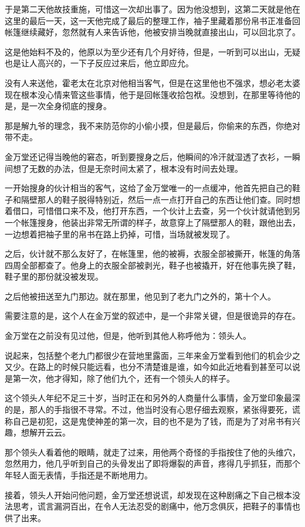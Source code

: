 于是第二天他故技重施，可惜这一次却出事了。因为他没想到，这第二天就是他在这里的最后一天，这一天他完成了最后的整理工作，袖子里藏着那份帛书正准备回帐篷继续藏好，忽然就有人来告诉他，他被安排当晚就直接出山，可以回北京了。

这是他始料不及的，他原以为至少还有几个月好待，但是，一听到可以出山，无疑也是让人高兴的，一下子反应过来后，他立即应允。

没有人来送他，霍老太在北京对他相当客气，但是在这里他也不强求，想必老太婆现在根本没心情来管这些事情，他于是回帐篷收拾包袱。没想到，在那里等待他的是，是一次全身彻底的搜身。

那是解九爷的理念，我不来防范你的小偷小摸，但是最后，你偷来的东西，你绝对带不走。

金万堂还记得当晚他的窘态，听到要搜身之后，他瞬间的冷汗就湿透了衣衫，一瞬间想了无数的办法，但是无奈时间太紧了，根本没有时间去处理。

一开始搜身的伙计相当的客气，这给了金万堂唯一的一点缓冲，他首先把自己的鞋子和隔壁那人的鞋子脱得特别近，然后一点一点打开自己的东西让他们查。同时想着借口，可惜借口来不及，他打开东西，一个伙计上去查，另一个伙计就请他到另一个帐篷搜身，他装出非常无所谓的样子，故意穿上了隔壁那人的鞋，跟他出去，一边想着把袖子里的帛书在路上扔掉，可惜，当场就被发现了。

之后，伙计就不那么友好了，在帐篷里，他的被褥，衣服全部被撕开，帐篷的角落四周全部都查了。他身上的衣服全部被剥光，鞋子也被撬开，好在他事先换了鞋，鞋子里的那份就没被发现。

之后他被扭送至九门那边。就在那里，他见到了老九门之外的，第十个人。

需要注意的是，这个人在金万堂的叙述中，是一个非常关键，但是很诡异的存在。

金万堂在之前没有见过他，但是，他听到其他人称呼他为：领头人。

说起来，包括整个老九门都很少在营地里露面，三年来金万堂看到他们的机会少之又少。在路上的时候只能远看，也分不清楚谁是谁，如今如此近地看到甚至可以说是第一次，他才得知，除了他们九个，还有一个领头人的样子。

这个领头人年纪不足三十岁，当时正在和另外的人商量什么事情，金万堂印象最深的是，那人的手指很不寻常。不过，他当时没有心思仔细去观察，紧张得要死，谎称自己是初犯，这是鬼使神差的第一次，目的也不是为了钱，而是为了对帛书有兴趣，想解开云云。

那个领头人看着他的眼睛，就走了过来，用他两个奇怪的手指按住了他的头维穴，忽然用力，他几乎听到自己的头骨发出了即将爆裂的声音，疼得几乎抓狂，而那个年轻人面无表情，手指还是不断地用力。

接着，领头人开始问他问题，金万堂还想说谎，却发现在这种剧痛之下自己根本没法思考，谎言漏洞百出，在令人无法忍受的剧痛中，他万念俱灰，把鞋子的事情也供了出来。

